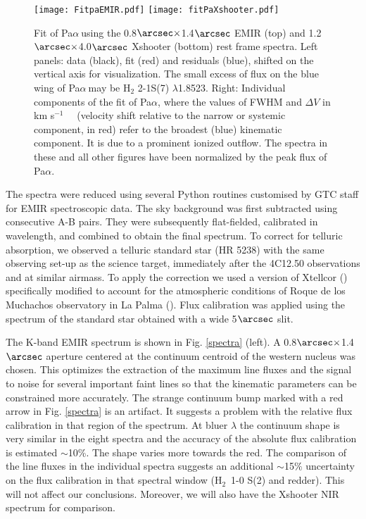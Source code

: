 \documentclass{aa}
\newcommand{\kms}{km s$^{-1}$~}
\newcommand{\pa}{Pa$\alpha~$}
\newcommand{\hmol}{H$_2$~}
\begin{document}
\begin{figure*}[ !ht ]
\centering
\texttt{[image: FitpaEMIR.pdf]}
\texttt{[image: fitPaXshooter.pdf]}
\caption{Fit of \pa  using the 0.8$\arcsec\times$1.4$\arcsec$ EMIR (top) and 1.2$\arcsec\times$4.0$\arcsec$ Xshooter (bottom) rest frame spectra. Left panels: data (black), fit (red) and residuals (blue), shifted on the vertical axis for visualization. The small excess of flux on the blue wing of \pa  may be H$_2$ 2-1S(7) $\lambda$1.8523. Right:  Individual components of the fit of Pa$\alpha$, where the values of FWHM and $\Delta V$   in \kms~ (velocity shift relative to the narrow or systemic component, in red) refer to the broadest (blue) kinematic component.  It is due to a prominent ionized outflow. The spectra in these and all other figures have been normalized by the peak flux of Pa$\alpha$.}
\label{pa1347}
\end{figure*}

The spectra were reduced using several Python routines customised by GTC staff for EMIR spectroscopic data. The sky background was first subtracted   using consecutive A-B pairs. They were subsequently  flat-fielded, calibrated in wavelength, and combined to obtain the final spectrum. To correct for telluric absorption, we observed a telluric standard star (HR 5238) with the same observing set-up as the science target, immediately  after the 4C12.50 observations and at similar airmass. To apply the correction we used a version of Xtellcor (\citealt{Vacca2003}) specifically modified to account  for the atmospheric conditions of    Roque de los Muchachos observatory in La Palma (\citealt{Ramos2009}). 
Flux calibration was applied using the spectrum of the standard star  obtained with a wide 5$\arcsec$ slit. 



The K-band EMIR spectrum is shown in Fig. \ref{spectra} (left).   A 0.8$\arcsec\times$1.4$\arcsec$ aperture centered  at the  continuum centroid of  the western nucleus was chosen. This  optimizes the extraction of the maximum line fluxes and the signal to noise for several important faint lines so that the kinematic parameters can be constrained more accurately.  
The strange continuum bump marked with a red arrow in Fig. \ref{spectra} is an artifact. It suggests a problem with the relative flux calibration in that region of the spectrum. At bluer $\lambda$ the continuum shape is very similar in the eight spectra and the accuracy of the absolute flux calibration  is estimated $\sim$10\%. The shape varies more  towards the red.  The comparison of the line fluxes in the individual spectra suggests an additional $\sim$15$\%$ uncertainty on  the flux calibration in that spectral window (\hmol 1-0 S(2) and redder). This will not affect our conclusions. Moreover, we will also  have the Xshooter NIR spectrum for comparison.  
\end{document}
